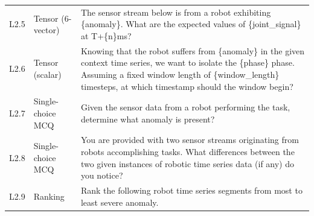 \documentclass{article}
\begin{document}
\begin{small}
\begin{longtable}{@{}>{\centering\arraybackslash}p{}>{\raggedright\arraybackslash}p{}>{\raggedright\arraybackslash}p{}@{}}
        L2.5        & Tensor (6-vector)      & The sensor stream below is from a robot exhibiting \{anomaly\}. What are the expected values of \{joint\_signal\} at T+\{n\}ms?                                                                                                                                                                                                                                                                                                                                                                    \\
        L2.6        & Tensor (scalar)        & Knowing that the robot suffers from \{anomaly\} in the given context time series, we want to isolate the \{phase\} phase. Assuming a fixed window length of \{window\_length\} timesteps, at which timestamp should the window begin?                                                                                                                                                                                                                                                              \\
        L2.7        & Single-choice MCQ      & Given the sensor data from a robot performing the task, determine what anomaly is present?                                                                                                                                                                                                                                                                                                                                                                                                         \\
        L2.8        & Single-choice MCQ      & You are provided with two sensor streams originating from robots accomplishing tasks. What differences between the two given instances of robotic time series data (if any) do you notice?                                                                                                                                                                                                                                                                                                         \\
        L2.9        & Ranking                & Rank the following robot time series segments from most to least severe anomaly.                                                                                                                                                                                                                                                                                                                                                                                                                   \\

\end{longtable}
\end{small}
\end{document}
